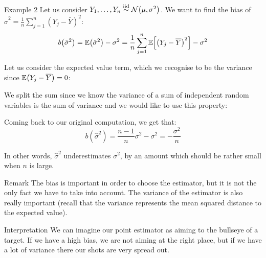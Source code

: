 \documentclass[a4paper]{article}
\begin{document}
\begin{parag}{Example 2}
    Let us consider $Y_1, \ldots, Y_n \iid \mathcal{N}\left(\mu, \sigma^2\right)$. We want to find the bias of $\hat{\sigma}^2 = \frac{1}{n}\sum_{j=1}^{n} \left(Y_j - \bar{Y}\right)^2$: 
    \[b\left(\hat{\sigma}^2\right) = \exval\left(\hat{\sigma}^2\right) - \sigma^2 = \frac{1}{n}\sum_{j=1}^{n} \exval\left[\left(Y_j - \bar{Y}\right)^2\right] - \sigma^2\]

    Let us consider the expected value term, which we recognise to be the variance since $\exval\left(Y_j - \bar{Y}\right) = 0$: 

    We split the sum since we know the variance of a sum of independent random variables is the sum of variance and we would like to use this property:

    Coming back to our original computation, we get that: 
    \[b\left(\hat{\sigma}^2\right) = \frac{n-1}{n}\sigma^2 - \sigma^2 = -\frac{\sigma^2}{n}\]
    
    In other words, $\hat{\sigma}^2$ underestimates $\sigma^2$, by an amount which should be rather small when $n$ is large.
\end{parag}

\begin{parag}{Remark}
    The bias is important in order to choose the estimator, but it is not the only fact we have to take into account. The variance of the estimator is also really important (recall that the variance represents the mean squared distance to the expected value).
\end{parag}

\begin{parag}{Interpretation}
    We can imagine our point estimator as aiming to the bullseye of a target. If we have a high bias, we are not aiming at the right place, but if we have a lot of variance there our shots are very spread out.
\end{parag}
\end{document}
